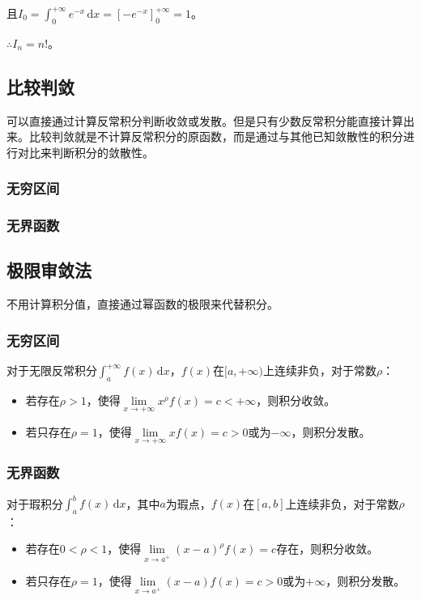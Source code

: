\documentclass[UTF8, 12pt]{ctexart}
\begin{document}
且$I_0=\int_0^{+\infty}e^{-x}\,\textrm{d}x=[-e^{-x}]_0^{+\infty}=1$。

$\therefore I_n=n!$。

\subsection{比较判敛}

可以直接通过计算反常积分判断收敛或发散。但是只有少数反常积分能直接计算出来。比较判敛就是不计算反常积分的原函数，而是通过与其他已知敛散性的积分进行对比来判断积分的敛散性。

\subsubsection{无穷区间}

\subsubsection{无界函数}

\subsection{极限审敛法}

不用计算积分值，直接通过幂函数的极限来代替积分。

\subsubsection{无穷区间}

对于无限反常积分$\int_a^{+\infty}f(x)\,\textrm{d}x$，$f(x)$在$[a,+\infty)$上连续非负，对于常数$\rho$：

\begin{itemize}
    \item 若存在$\rho>1$，使得$\lim\limits_{x\to+\infty}x^\rho f(x)=c<+\infty$，则积分收敛。
    \item 若只存在$\rho=1$，使得$\lim\limits_{x\to+\infty}xf(x)=c>0$或为$-\infty$，则积分发散。
\end{itemize}

\subsubsection*{无界函数}

对于瑕积分$\int_a^bf(x)\,\textrm{d}x$，其中$a$为瑕点，$f(x)$在$[a,b]$上连续非负，对于常数$\rho$：

\begin{itemize}
    \item 若存在$0<\rho<1$，使得$\lim\limits_{x\to a^+}(x-a)^\rho f(x)=c$存在，则积分收敛。
    \item 若只存在$\rho=1$，使得$\lim\limits_{x\to a^+}(x-a)f(x)=c>0$或为$+\infty$，则积分发散。
\end{itemize}
\end{document}
